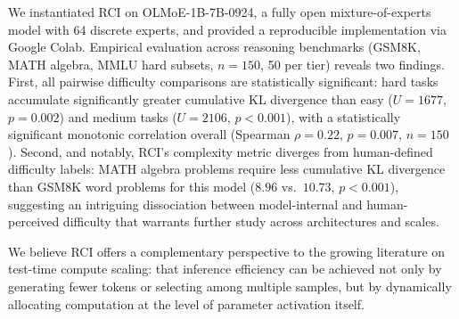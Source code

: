 \documentclass{article}
\begin{document}
We instantiated RCI on OLMoE-1B-7B-0924, a fully open
mixture-of-experts model with 64 discrete experts, and provided
a reproducible implementation via Google Colab.
Empirical evaluation across reasoning benchmarks (GSM8K, MATH
algebra, MMLU hard subsets, $n{=}150$, 50 per tier) reveals two
findings.
First, all pairwise difficulty comparisons are statistically
significant: hard tasks accumulate significantly greater
cumulative KL divergence than easy ($U{=}1677$, $p{=}0.002$) and
medium tasks ($U{=}2106$, $p{<}0.001$), with a statistically
significant monotonic correlation overall
(Spearman $\rho{=}0.22$, $p{=}0.007$, $n{=}150$).
Second, and notably, RCI's complexity metric diverges from
human-defined difficulty labels: MATH algebra problems require
less cumulative KL divergence than GSM8K word problems for this
model ($8.96$ vs.\ $10.73$, $p{<}0.001$), suggesting an
intriguing dissociation between model-internal and
human-perceived difficulty that warrants further study across
architectures and scales.

We believe RCI offers a complementary perspective to the growing
literature on test-time compute scaling: that inference efficiency
can be achieved not only by generating fewer tokens or selecting
among multiple samples, but by dynamically allocating computation
at the level of parameter activation itself.


\end{document}
